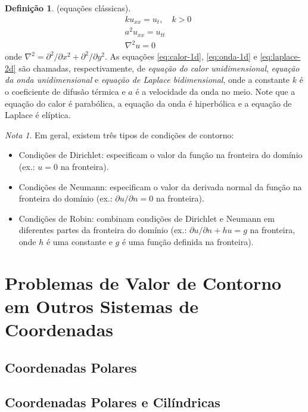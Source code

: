 \documentclass{article}
\theoremstyle{plain}
\theoremstyle{definition}
\newtheorem{defn}{Definição}[section]
\theoremstyle{remark}
\newtheorem*{rem}{Nota}
\begin{document}
\begin{defn} (equações clássicas).
    \begin{align}
        &k u_{xx} = u_t, \quad k>0 \label{eq:calor-1d} \\
        &a^2 u_{xx} = u_{tt} \label{eq:onda-1d} \\
        &\nabla^2 u = 0 \label{eq:laplace-2d}
    \end{align}
    \noindent onde \(\nabla^2 = \partial^2/\partial x^2 + \partial^2/\partial y^2\).
    As equações \eqref{eq:calor-1d}, \eqref{eq:onda-1d} e \eqref{eq:laplace-2d} são chamadas, respectivamente, de \emph{equação do calor unidimensional}, \emph{equação da onda unidimensional} e \emph{equação de Laplace bidimensional}, onde a constante \(k\) é o coeficiente de difusão térmica e \(a\) é a velocidade da onda no meio.
    Note que a equação do calor é parabólica, a equação da onda é hiperbólica e a equação de Laplace é elíptica.
\end{defn}

\begin{rem}
    Em geral, existem três tipos de condições de contorno:
    \begin{itemize}
        \item[(i)] Condições de Dirichlet: especificam o valor da função na fronteira do domínio (ex.: \(u=0\) na fronteira).
        \item[(ii)] Condições de Neumann: especificam o valor da derivada normal da função na fronteira do domínio (ex.: \(\partial u/\partial n=0\) na fronteira).
        \item[(iii)] Condições de Robin: combinam condições de Dirichlet e Neumann em diferentes partes da fronteira do domínio (ex.: \(\partial u/\partial n + hu = g\) na fronteira, onde \(h\) é uma constante e \(g\) é uma função definida na fronteira).
    \end{itemize}
\end{rem}

\section{Problemas de Valor de Contorno em Outros Sistemas de Coordenadas}

\subsection{Coordenadas Polares}
\subsection{Coordenadas Polares e Cilíndricas}
\end{document}
